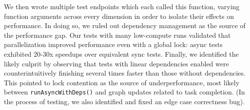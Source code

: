 \documentclass[11pt]{article}
\begin{document}
\bigskip
We then wrote multiple test endpoints which each called this function, varying
function arguments across every dimension in order to isolate their effects on
performance. In doing so, we ruled out dependency management as the source of
the performance gap. Our tests with many low-compute runs validated that
parallelization improved performance even with a global lock: async tests
exhibited 20-30x speedups over equivalent sync tests. Finally, we identified the
likely culprit by observing that tests with linear dependencies enabled were
counterintuitively finishing several times faster than those without
dependencies. This pointed to lock contention as the source of underperformance,
most likely between \verb|runAsyncWithDeps()| and graph updates related to task
completion. (In the process of testing, we also identified and fixed an edge
case correctness bug).

\end{document}
